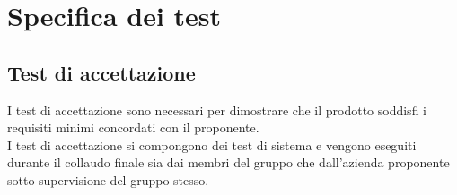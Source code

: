 \section{Specifica dei test}\label{section:specifica_test}

\subsection{Test di accettazione}\label{subsection:test_accettazione}
I test di accettazione sono necessari per dimostrare che il prodotto soddisfi i requisiti minimi concordati con il proponente. \\
I test di accettazione si compongono dei test di sistema e vengono eseguiti durante il collaudo finale sia dai membri del 
gruppo che dall'azienda proponente sotto supervisione del gruppo stesso.

